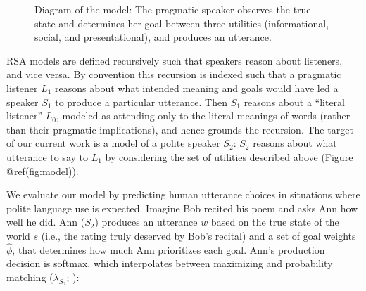 \documentclass[12pt]{article}
\begin{document}
\begin{figure}
\centering
\caption{\label{fig:model}Diagram of the model: The pragmatic speaker observes the true state and determines her goal between three utilities (informational, social, and presentational), and produces an utterance.
}
\end{figure}


RSA models are defined recursively such that speakers reason about
listeners, and vice versa. By convention this recursion is indexed such
that a pragmatic listener \(L_1\) reasons about what intended meaning
and goals would have led a speaker \(S_1\) to produce a particular
utterance. Then \(S_1\) reasons about a \enquote{literal listener}
\(L_0\), modeled as attending only to the literal meanings of words
(rather than their pragmatic implications), and hence grounds the
recursion. The target of our current work is a model of a polite speaker
\(S_2\): \(S_2\) reasons about what utterance to say to \(L_1\) by
considering the set of utilities described above (Figure
@ref(fig:model)).

We evaluate our model by predicting human utterance choices in
situations where polite language use is expected. Imagine Bob recited
his poem and asks Ann how well he did. Ann (\(S_2\)) produces an
utterance \(w\) based on the true state of the world \(s\) (i.e., the
rating truly deserved by Bob's recital) and a set of goal weights
\(\hat{\phi}\), that determines how much Ann prioritizes each goal.
Ann's production decision is softmax, which interpolates between
maximizing and probability matching (\(\lambda_{S_2}\); \cite{goodman2013}):
\end{document}
